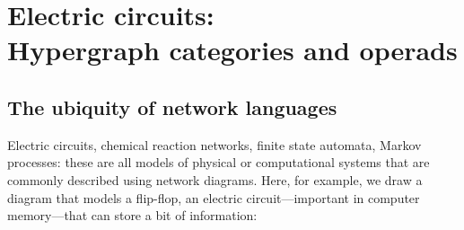 \documentclass[7Sketches]{subfiles}
\begin{document}
\setcounter{chapter}{5}%
\chapter[Circuits: hypergraph categories and operads]{Electric circuits:\\Hypergraph categories and operads}%
\label{chap.hypergraph_cats}


\section{The ubiquity of network languages}%

Electric circuits, chemical reaction networks, finite state automata, Markov
processes: these are all models of physical or computational systems that are
commonly described using network diagrams. Here, for example, we draw a diagram
that models a flip-flop, an electric circuit---important in computer
memory---that can store a bit of information:%
\end{document}
